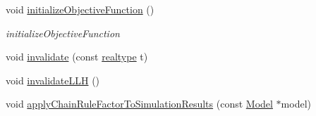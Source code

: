 \begin{DoxyCompactItemize}
\item 
\mbox{\label{classamici_1_1_return_data_a014198f2b584ac5b1a2b8a5dea13e411}} 
void \mbox{\hyperlink{classamici_1_1_return_data_a014198f2b584ac5b1a2b8a5dea13e411}{initialize\+Objective\+Function}} ()
\begin{DoxyCompactList}\small\item\em initialize\+Objective\+Function \end{DoxyCompactList}\item 
void \mbox{\hyperlink{classamici_1_1_return_data_ab320e46748c17908f0bd4bba240b8e92}{invalidate}} (const \mbox{\hyperlink{namespaceamici_a1bdce28051d6a53868f7ccbf5f2c14a3}{realtype}} t)
\item 
void \mbox{\hyperlink{classamici_1_1_return_data_a03e88745280c032d3b59fd7235665e17}{invalidate\+L\+LH}} ()
\item 
void \mbox{\hyperlink{classamici_1_1_return_data_adce202dc864a1e65d8453f597de271f5}{apply\+Chain\+Rule\+Factor\+To\+Simulation\+Results}} (const \mbox{\hyperlink{classamici_1_1_model}{Model}} $\ast$model)
\end{DoxyCompactItemize}
